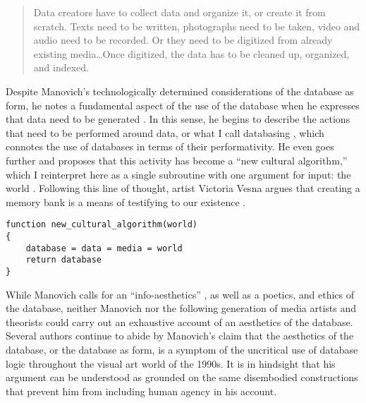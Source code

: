 \begin{quote}
	Data creators have to collect data and organize it, or create it from scratch. Texts need to be written, photographs need to be taken, video and audio need to be recorded. Or they need to be digitized from already existing media\dots Once digitized, the data has to be cleaned up, organized, and indexed. \parencite[224]{Man01:The}
\end{quote}

Despite Manovich's technologically determined considerations of the database as form, he notes a fundamental aspect of the use of the database when he expresses that data need to be generated \parencite[224]{Man01:The}. In this sense, he begins to describe the actions that need to be performed around data, or what I call databasing , which connotes the use of databases in terms of their performativity. He even goes further and proposes that this activity has become a ``new cultural algorithm,'' \parencite[225]{Man01:The} which I reinterpret here as a single subroutine with one argument for input: the world . Following this line of thought, artist Victoria Vesna \parencite{Ves07:See} argues that creating a memory bank is a means of testifying to our existence \parencite[25]{Ves07:See}. 

\begin{flushleft}
\small
\begin{lstlisting}[caption={Manovich's cultural algorithm as a pseudocode routine with the world as argument (i.e, as input). The world is then mediatized, stored in some media (film, tape), then digitized into data, then structured as a database. This routine returns the database, which is, henceforth, the world re-presented as database.},captionpos=b,label={lst:manovich}]
function new_cultural_algorithm(world) 
{
	database = data = media = world
	return database
}
\end{lstlisting}
\end{flushleft}

While Manovich calls for an ``info-aesthetics'' \parencite[217]{Man01:The}, as well as a poetics, and ethics of the database, neither Manovich nor the following generation of media artists and theorists could carry out an exhaustive account of an aesthetics of the database. Several authors continue to abide by Manovich's claim that the aesthetics of the database, or the database as form, is a symptom of the uncritical use of database logic throughout the visual art world of the 1990s. It is in hindsight that his argument can be understood as grounded on the same disembodied constructions that prevent him from including human agency in his account.


